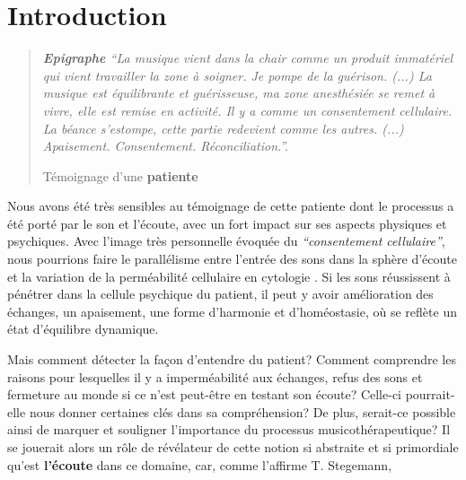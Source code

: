 

\chapter{Introduction}



\begin{quotation}
 \textit{\textbf{Epigraphe  }   ``La musique vient dans la chair comme un produit immatériel
 qui vient travailler la zone à soigner. Je pompe de la
 guérison.
 (...)
 La musique est équilibrante et guérisseuse, ma zone
 anesthésiée se remet à vivre, elle est remise en activité.
 Il y a comme un consentement cellulaire.
La béance s'estompe, cette
partie redevient comme les autres. (...)
Apaisement. Consentement. Réconciliation.''.}

Témoignage d'une\textbf{
patiente}

\end{quotation}

Nous avons été très sensibles au témoignage de cette patiente dont le
processus a été porté par le son et l'écoute, avec un fort impact
sur ses aspects physiques
et psychiques.
Avec l'image très personnelle évoquée du
\textit{``consentement cellulaire''}, nous pourrions faire le
parallélisme entre l'entrée des sons dans la sphère d'écoute et la variation de la
perméabilité cellulaire en cytologie \autocite[ch. 3 pp. 70--76]{marieb:biologie}. Si les sons réussissent à pénétrer dans la
cellule psychique du patient, il peut y avoir amélioration des
échanges, un apaisement, une forme d'harmonie et d'homéostasie,  \autocite[ch. 1
p. 10]{marieb:biologie} où se reflète un état d'équilibre dynamique.

Mais comment détecter la façon d'entendre du patient?
Comment comprendre les raisons pour lesquelles il y a imperméabilité
aux
échanges, refus des sons et fermeture au monde si ce n'est
peut-être  en testant
son écoute?  Celle-ci pourrait-elle nous donner certaines clés dans sa
compréhension?
De plus, serait-ce possible ainsi
de marquer et souligner l'importance du processus musicothérapeutique?
Il se jouerait alors un
rôle de
révélateur de cette notion si abstraite et si primordiale qu'est
\textbf{l'écoute} dans ce domaine, car, comme l'affirme T. Stegemann,


